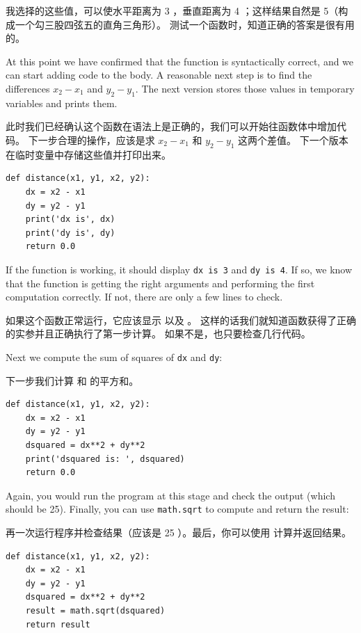 我选择的这些值，可以使水平距离为 3 ，垂直距离为 4 ；这样结果自然是 5（构成一个勾三股四弦五的直角三角形）。 测试一个函数时，知道正确的答案是很有用的。


At this point we have confirmed that the function is syntactically
correct, and we can start adding code to the body.
A reasonable next step is to find the differences
$x_2 - x_1$ and $y_2 - y_1$.  The next version stores those values in
temporary variables and prints them.

此时我们已经确认这个函数在语法上是正确的，我们可以开始往函数体中增加代码。
下一步合理的操作，应该是求 $x_2 - x_1$ 和 $y_2 - y_1$ 这两个差值。
下一个版本在临时变量中存储这些值并打印出来。

\begin{lstlisting}
def distance(x1, y1, x2, y2):
    dx = x2 - x1
    dy = y2 - y1
    print('dx is', dx)
    print('dy is', dy)
    return 0.0
\end{lstlisting}

%
If the function is working, it should display \verb"dx is 3" and
\verb"dy is 4".  If so, we know that the function is getting the right
arguments and performing the first computation correctly.  If not,
there are only a few lines to check.

如果这个函数正常运行，它应该显示   以及  。
这样的话我们就知道函数获得了正确的实参并且正确执行了第一步计算。
如果不是，也只要检查几行代码。

Next we compute the sum of squares of {\tt dx} and {\tt dy}:

下一步我们计算  和  的平方和。

\begin{lstlisting}
def distance(x1, y1, x2, y2):
    dx = x2 - x1
    dy = y2 - y1
    dsquared = dx**2 + dy**2
    print('dsquared is: ', dsquared)
    return 0.0
\end{lstlisting}

%
Again, you would run the program at this stage and check the output
(which should be 25).
Finally, you can use {\tt math.sqrt} to compute and return the result:

再一次运行程序并检查结果（应该是 25 ）。最后，你可以使用  计算并返回结果。
  

\begin{lstlisting}
def distance(x1, y1, x2, y2):
    dx = x2 - x1
    dy = y2 - y1
    dsquared = dx**2 + dy**2
    result = math.sqrt(dsquared)
    return result
\end{lstlisting}

